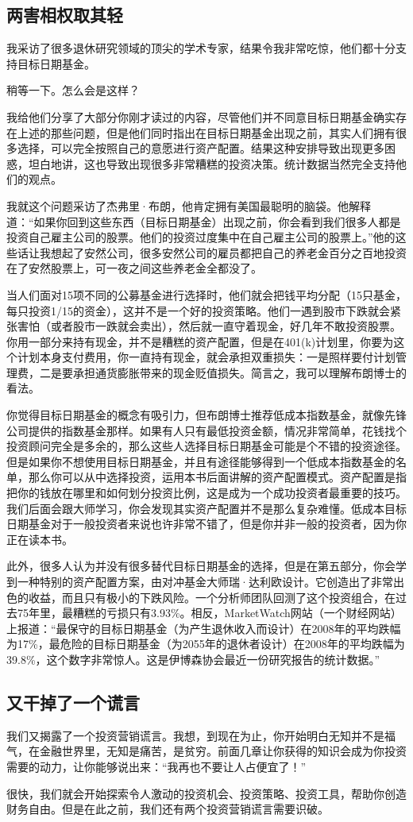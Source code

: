 \subsection{两害相权取其轻}

我采访了很多退休研究领域的顶尖的学术专家，结果令我非常吃惊，他们都十分支持目标日期基金。

稍等一下。怎么会是这样？

我给他们分享了大部分你刚才读过的内容，尽管他们并不同意目标日期基金确实存在上述的那些问题，但是他们同时指出在目标日期基金出现之前，其实人们拥有很多选择，可以完全按照自己的意愿进行资产配置。结果这种安排导致出现更多困惑，坦白地讲，这也导致出现很多非常糟糕的投资决策。统计数据当然完全支持他们的观点。

我就这个问题采访了杰弗里·布朗，他肯定拥有美国最聪明的脑袋。他解释道：“如果你回到这些东西（目标日期基金）出现之前，你会看到我们很多人都是投资自己雇主公司的股票。他们的投资过度集中在自己雇主公司的股票上。”他的这些话让我想起了安然公司，很多安然公司的雇员都把自己的养老金百分之百地投资在了安然股票上，可一夜之间这些养老金全都没了。

当人们面对15项不同的公募基金进行选择时，他们就会把钱平均分配（15只基金，每只投资1/15的资金），这并不是一个好的投资策略。他们一遇到股市下跌就会紧张害怕（或者股市一跌就会卖出），然后就一直守着现金，好几年不敢投资股票。你用一部分来持有现金，并不是糟糕的资产配置，但是在401(k)计划里，你要为这个计划本身支付费用，你一直持有现金，就会承担双重损失：一是照样要付计划管理费，二是要承担通货膨胀带来的现金贬值损失。简言之，我可以理解布朗博士的看法。

你觉得目标日期基金的概念有吸引力，但布朗博士推荐低成本指数基金，就像先锋公司提供的指数基金那样。如果有人只有最低投资金额，情况非常简单，花钱找个投资顾问完全是多余的，那么这些人选择目标日期基金可能是个不错的投资途径。但是如果你不想使用目标日期基金，并且有途径能够得到一个低成本指数基金的名单，那么你可以从中选择投资，运用本书后面讲解的资产配置模式。资产配置是指把你的钱放在哪里和如何划分投资比例，这是成为一个成功投资者最重要的技巧。我们后面会跟大师学习，你会发现其实资产配置并不是那么复杂难懂。低成本目标日期基金对于一般投资者来说也许非常不错了，但是你并非一般的投资者，因为你正在读本书。

此外，很多人认为并没有很多替代目标日期基金的选择，但是在第五部分，你会学到一种特别的资产配置方案，由对冲基金大师瑞·达利欧设计。它创造出了非常出色的收益，而且只有极小的下跌风险。一个分析师团队回测了这个投资组合，在过去75年里，最糟糕的亏损只有3.93\%。相反，MarketWatch网站（一个财经网站）上报道：“最保守的目标日期基金（为产生退休收入而设计）在2008年的平均跌幅为17\%，最危险的目标日期基金（为2055年的退休者设计）在2008年的平均跌幅为39.8\%，这个数字非常惊人。这是伊博森协会最近一份研究报告的统计数据。”

\subsection{又干掉了一个谎言}

我们又揭露了一个投资营销谎言。我想，到现在为止，你开始明白无知并不是福气，在金融世界里，无知是痛苦，是贫穷。前面几章让你获得的知识会成为你投资需要的动力，让你能够说出来：“我再也不要让人占便宜了！”

很快，我们就会开始探索令人激动的投资机会、投资策略、投资工具，帮助你创造财务自由。但是在此之前，我们还有两个投资营销谎言需要识破。
